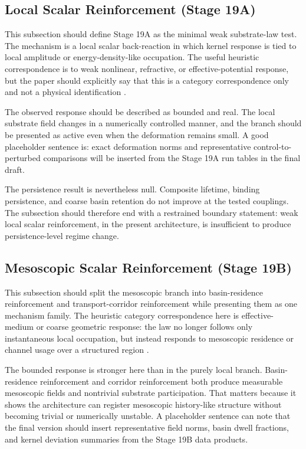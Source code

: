 \documentclass[11pt]{article}
\begin{document}
\subsection{Local Scalar Reinforcement (Stage 19A)}

This subsection should define Stage 19A as the minimal weak substrate-law test. The mechanism is a local scalar back-reaction in which kernel response is tied to local amplitude or energy-density-like occupation. The useful heuristic correspondence is to weak nonlinear, refractive, or effective-potential response, but the paper should explicitly say that this is a category correspondence only and not a physical identification \cite{nonlinear_placeholder}.

The observed response should be described as bounded and real. The local substrate field changes in a numerically controlled manner, and the branch should be presented as active even when the deformation remains small. A good placeholder sentence is: exact deformation norms and representative control-to-perturbed comparisons will be inserted from the Stage 19A run tables in the final draft.

The persistence result is nevertheless null. Composite lifetime, binding persistence, and coarse basin retention do not improve at the tested couplings. The subsection should therefore end with a restrained boundary statement: weak local scalar reinforcement, in the present architecture, is insufficient to produce persistence-level regime change.

\subsection{Mesoscopic Scalar Reinforcement (Stage 19B)}

This subsection should split the mesoscopic branch into basin-residence reinforcement and transport-corridor reinforcement while presenting them as one mechanism family. The heuristic category correspondence here is effective-medium or coarse geometric response: the law no longer follows only instantaneous local occupation, but instead responds to mesoscopic residence or channel usage over a structured region \cite{effective_medium_placeholder,emergent_geometry_placeholder}.

The bounded response is stronger here than in the purely local branch. Basin-residence reinforcement and corridor reinforcement both produce measurable mesoscopic fields and nontrivial substrate participation. That matters because it shows the architecture can register mesoscopic history-like structure without becoming trivial or numerically unstable. A placeholder sentence can note that the final version should insert representative field norms, basin dwell fractions, and kernel deviation summaries from the Stage 19B data products.
\end{document}
